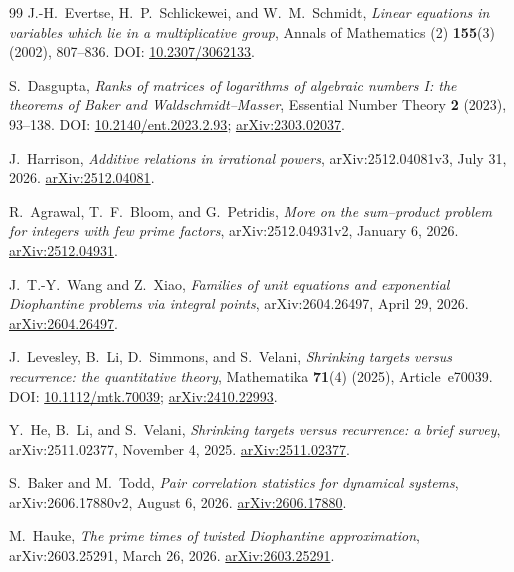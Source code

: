 \documentclass[11pt,oneside]{article}
\theoremstyle{definition}
\theoremstyle{remark}
\begin{document}
\begin{thebibliography}{99}
J.-H.~Evertse, H.~P.~Schlickewei, and W.~M.~Schmidt,
\newblock \emph{Linear equations in variables which lie in a multiplicative group},
\newblock Annals of Mathematics (2) \textbf{155}(3) (2002), 807--836.
\newblock DOI: \href{https://doi.org/10.2307/3062133}{10.2307/3062133}.

S.~Dasgupta,
\newblock \emph{Ranks of matrices of logarithms of algebraic numbers I: the theorems of Baker and Waldschmidt--Masser},
\newblock Essential Number Theory \textbf{2} (2023), 93--138.
\newblock DOI: \href{https://doi.org/10.2140/ent.2023.2.93}{10.2140/ent.2023.2.93};
\href{https://arxiv.org/abs/2303.02037}{arXiv:2303.02037}.

J.~Harrison,
\newblock \emph{Additive relations in irrational powers},
\newblock arXiv:2512.04081v3, July 31, 2026.
\newblock \href{https://arxiv.org/abs/2512.04081}{arXiv:2512.04081}.

R.~Agrawal, T.~F.~Bloom, and G.~Petridis,
\newblock \emph{More on the sum--product problem for integers with few prime factors},
\newblock arXiv:2512.04931v2, January 6, 2026.
\newblock \href{https://arxiv.org/abs/2512.04931}{arXiv:2512.04931}.

J.~T.-Y.~Wang and Z.~Xiao,
\newblock \emph{Families of unit equations and exponential Diophantine problems via integral points},
\newblock arXiv:2604.26497, April 29, 2026.
\newblock \href{https://arxiv.org/abs/2604.26497}{arXiv:2604.26497}.

J.~Levesley, B.~Li, D.~Simmons, and S.~Velani,
\newblock \emph{Shrinking targets versus recurrence: the quantitative theory},
\newblock Mathematika \textbf{71}(4) (2025), Article~e70039.
\newblock DOI: \href{https://doi.org/10.1112/mtk.70039}{10.1112/mtk.70039};
\href{https://arxiv.org/abs/2410.22993}{arXiv:2410.22993}.

Y.~He, B.~Li, and S.~Velani,
\newblock \emph{Shrinking targets versus recurrence: a brief survey},
\newblock arXiv:2511.02377, November 4, 2025.
\newblock \href{https://arxiv.org/abs/2511.02377}{arXiv:2511.02377}.

S.~Baker and M.~Todd,
\newblock \emph{Pair correlation statistics for dynamical systems},
\newblock arXiv:2606.17880v2, August 6, 2026.
\newblock \href{https://arxiv.org/abs/2606.17880}{arXiv:2606.17880}.

M.~Hauke,
\newblock \emph{The prime times of twisted Diophantine approximation},
\newblock arXiv:2603.25291, March 26, 2026.
\newblock \href{https://arxiv.org/abs/2603.25291}{arXiv:2603.25291}.


\end{thebibliography}
\end{document}
